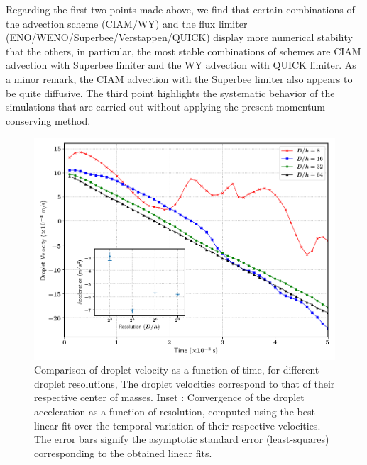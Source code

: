 Regarding the first two points made above, we find that certain combinations of the advection scheme (CIAM/WY) and the flux limiter (ENO/WENO/Superbee/Verstappen/QUICK) display more numerical stability that the others, in particular, the most stable combinations of schemes are CIAM advection with Superbee limiter and the WY advection with QUICK limiter. As a minor remark, the CIAM advection with the Superbee limiter also appears to be quite diffusive. The third point highlights the systematic behavior of the simulations that are carried out without applying the present momentum-conserving method. 

\vspace*{0.2cm}

\begin{figure}
\begin{center}
\includegraphics[scale = 0.5]{Figures/Sagar/dropl_velocity_accel_ppd.png}
\end{center}
\vspace*{-0.5cm}
\caption{Comparison of droplet velocity as a function of time, for different droplet resolutions, The droplet velocities correspond to that of their respective center of masses. Inset : Convergence of the droplet acceleration as a function of resolution, computed using the best linear fit over the temporal variation of their respective velocities. The error bars signify the asymptotic standard error (least-squares) corresponding to the obtained linear fits.} 
\label{drop_vel}
\end{figure}

